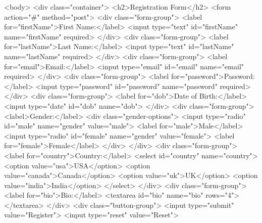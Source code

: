 <body>
    <div class="container">
        <h2>Registration Form</h2>
        <form action="#" method="post">
            <div class="form-group">
                <label for="firstName">First Name:</label>
                <input type="text" id="firstName" name="firstName" required>
            </div>
            <div class="form-group">
                <label for="lastName">Last Name:</label>
                <input type="text" id="lastName" name="lastName" required>
            </div>
            <div class="form-group">
                <label for="email">Email:</label>
                <input type="email" id="email" name="email" required>
            </div>
            <div class="form-group">
                <label for="password">Password:</label>
                <input type="password" id="password" name="password" required>
            </div>
            <div class="form-group">
                <label for="dob">Date of Birth:</label>
                <input type="date" id="dob" name="dob">
            </div>
            <div class="form-group">
                <label>Gender:</label>
                <div class="gender-options">
                    <input type="radio" id="male" name="gender" value="male">
                    <label for="male">Male</label>
                    <input type="radio" id="female" name="gender" value="female">
                    <label for="female">Female</label>
                </div>
            </div>
            <div class="form-group">
                <label for="country">Country:</label>
                <select id="country" name="country">
                    <option value="usa">USA</option>
                    <option value="canada">Canada</option>
                    <option value="uk">UK</option>
                    <option value="india">India</option>
                </select>
            </div>
            <div class="form-group">
                <label for="bio">Bio:</label>
                <textarea id="bio" name="bio" rows="4"></textarea>
            </div>
            <div class="button-group">
                <input type="submit" value="Register">
                <input type="reset" value="Reset">
